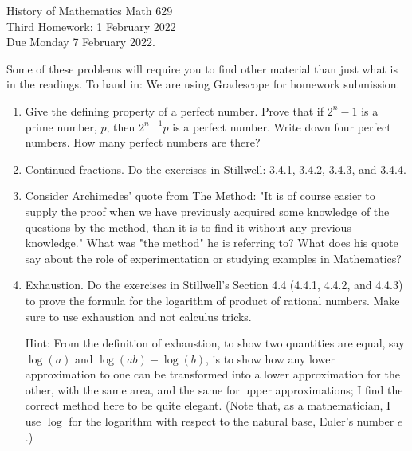 \documentclass[12pt]{article}
\begin{document}
\LARGE 
\noindent
{\color{Maroon}History of Mathematics \hfill Math 629}\vspace{2pt}\\
\large
Third Homework: \hfill 1 February 2022\\
Due Monday 7 February 2022.
\normalsize\vspace{10pt}

      Some of these problems will require you to find other material than just what is in the readings.
To hand in: We are using Gradescope for homework submission.


\begin{enumerate}

\item    Give the defining property of a perfect number. Prove that if $2^n-1$ is a prime number, $p$, then $2^{n-1}p$ is a perfect number.
  Write down
  four perfect numbers.
  How many perfect numbers are there? 


\item   Continued fractions.  Do the exercises in Stillwell: 3.4.1, 3.4.2, 3.4.3, and 3.4.4.


\item    Consider Archimedes' quote from The Method: "It is of course easier to supply the proof when we have previously acquired some
  knowledge of the questions by the method, than it is to find it without any previous knowledge." What was "the method" he is referring to?
  What does his quote say about the role of experimentation or studying examples in Mathematics?  


\item    Exhaustion.
  Do the exercises in Stillwell's Section 4.4 (4.4.1, 4.4.2, and 4.4.3) to prove the formula for the logarithm of product of rational
  numbers. Make sure to use exhaustion and not calculus tricks.
  
  Hint: From the definition of exhaustion, to show two quantities are equal, say $\log(a)$ and $\log(ab)-\log(b)$,
  is to show how any lower approximation to one can be transformed into a lower approximation for the other, with the same area, and the
  same for upper approximations; I find the correct method here to be quite elegant.
  (Note that, as a mathematician, I use $\log$ for the logarithm with respect to the natural base, Euler's
  number $e$.)  
       
\end{enumerate}
\end{document}

